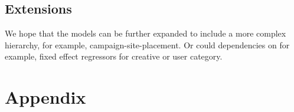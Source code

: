 \documentclass[11pt,a4,singlespacing,titlepagenumber=on]{scrreprt}
\numberwithin{equation}{chapter} %
\theoremstyle{remark}
\begin{document}
\section{Extensions}


We hope that the models can be further expanded to include a more complex hierarchy, for example, campaign-site-placement. Or could dependencies on for example, fixed effect regressors for creative or user category.














\cleardoublepage
{}




{}


\appendix %


\chapter{Appendix}
\end{document}
